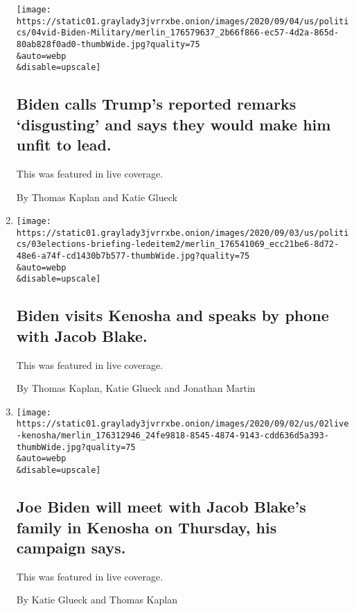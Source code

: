 \begin{enumerate}
  \texttt{[image: https://static01.graylady3jvrrxbe.onion/images/2020/09/04/us/politics/04vid-Biden-Military/merlin\_176579637\_2b66f866-ec57-4d2a-865d-80ab828f0ad0-thumbWide.jpg?quality=75\\\&auto=webp\\\&disable=upscale]}

  \hypertarget{biden-calls-trumps-reported-remarks-disgusting-and-says-they-would-make-him-unfit-to-lead}{%
  \subsection{Biden calls Trump's reported remarks `disgusting' and says
  they would make him unfit to
  lead.}\label{biden-calls-trumps-reported-remarks-disgusting-and-says-they-would-make-him-unfit-to-lead}}

  This was featured in live coverage.

  By Thomas Kaplan and Katie Glueck
\item
  \href{/live/2020/09/03/us/trump-vs-biden/biden-visits-kenosha-and-speaks-by-phone-with-jacob-blake}{}

  \texttt{[image: https://static01.graylady3jvrrxbe.onion/images/2020/09/03/us/politics/03elections-briefing-ledeitem2/merlin\_176541069\_ecc21be6-8d72-48e6-a74f-cd1430b7b577-thumbWide.jpg?quality=75\\\&auto=webp\\\&disable=upscale]}

  \hypertarget{biden-visits-kenosha-and-speaks-by-phone-with-jacob-blake}{%
  \subsection{Biden visits Kenosha and speaks by phone with Jacob
  Blake.}\label{biden-visits-kenosha-and-speaks-by-phone-with-jacob-blake}}

  This was featured in live coverage.

  By Thomas Kaplan, Katie Glueck and Jonathan Martin
\item
  \href{/live/2020/09/02/us/trump-vs-biden/joe-biden-will-meet-with-jacob-blakes-family-in-kenosha-on-thursday-his-campaign-says}{}

  \texttt{[image: https://static01.graylady3jvrrxbe.onion/images/2020/09/02/us/02live-kenosha/merlin\_176312946\_24fe9818-8545-4874-9143-cdd636d5a393-thumbWide.jpg?quality=75\\\&auto=webp\\\&disable=upscale]}

  \hypertarget{joe-biden-will-meet-with-jacob-blakes-family-in-kenosha-on-thursday-his-campaign-says}{%
  \subsection{Joe Biden will meet with Jacob Blake's family in Kenosha
  on Thursday, his campaign
  says.}\label{joe-biden-will-meet-with-jacob-blakes-family-in-kenosha-on-thursday-his-campaign-says}}

  This was featured in live coverage.

  By Katie Glueck and Thomas Kaplan
\end{enumerate}

